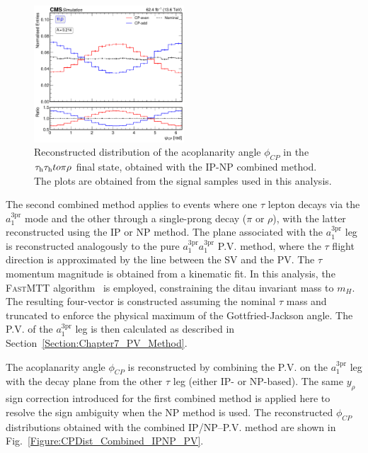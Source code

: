 \begin{figure}[!htbp]
    \centering
    \includegraphics[width=0.5\textwidth]{Figures/Chapter7/Acoplanarity/With_IP/aco_pi_rho.pdf}
    \caption[Reconstructed $\phi_{CP}$ distribution in the $\tau_h\tau_h\to\pi\rho$ category using the IP-NP combined method.]
    {Reconstructed distribution of the acoplanarity angle $\phi_{CP}$ in the $\tau_\mathrm{h}\tau_\mathrm{h} to \pi\rho$ final state, obtained with the \ac{IP}-\ac{NP} combined method. The plots are obtained from the signal samples used in this analysis.}
    \label{Figure:CPDist_Combined_IP_NP}
\end{figure}

The second combined method applies to events where one $\tau$ lepton decays via the $a_1^\text{3pr}$ mode and the other through a single-prong decay ($\pi$ or $\rho$), with the latter reconstructed using the \ac{IP} or \ac{NP} method. The plane associated with the $a_1^\text{3pr}$ leg is reconstructed analogously to the pure $a_1^\text{3pr}$$a_1^\text{3pr}$ \ac{P.V.} method, where the $\tau$ flight direction is approximated by the line between the \ac{SV} and the \ac{PV}. The $\tau$ momentum magnitude is obtained from a kinematic fit. In this analysis, the \textsc{FastMTT} algorithm~\cite{Bianchini:2014vza} is employed, constraining the ditau invariant mass to $m_H$. The resulting four-vector is constructed assuming the nominal $\tau$ mass and truncated to enforce the physical maximum of the Gottfried-Jackson angle. The \ac{P.V.} of the $a_1^\text{3pr}$ leg is then calculated as described in Section~\ref{Section:Chapter7_PV_Method}.

The acoplanarity angle $\phi_{CP}$ is reconstructed by combining the \ac{P.V.} on the $a_1^{3\text{pr}}$ leg with the decay plane from the other $\tau$ leg (either \ac{IP}- or \ac{NP}-based). The same $y_\rho$ sign correction introduced for the first combined method is applied here to resolve the sign ambiguity when the \ac{NP} method is used. The reconstructed $\phi_{CP}$ distributions obtained with the combined \ac{IP}/\ac{NP}--\ac{P.V.} method are shown in Fig.~\ref{Figure:CPDist_Combined_IPNP_PV}.

